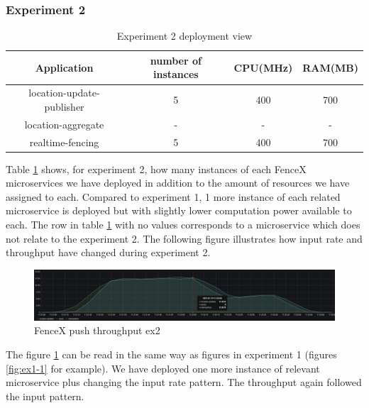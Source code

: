 \documentclass[a4]{report}
\begin{document}
    \clearpage

    \subsubsection{Experiment 2}
    \begin{table}[h!]
        \centering
        \begin{tabular}{|c|c|c|c|}
            \hline
            Application               & number of instances & CPU(MHz) & RAM(MB) \\
            \hline
            location-update-publisher & 5                   & 400      & 700     \\
            location-aggregate        & -                   & -        & -       \\
            realtime-fencing          & 5                   & 400      & 700     \\
            \hline
        \end{tabular}
        \caption{Experiment 2 deployment view}
        \label{table:ex2-dv}
    \end{table}

    Table \ref{table:ex2-dv} shows, for experiment 2, how many instances of each FenceX microservices we have
    deployed in addition to the amount of resources we have assigned to each.
    Compared to experiment 1, 1 more instance of each related microservice is deployed but with slightly lower
    computation power available to each.
    The row in table \ref{table:ex2-dv} with no values corresponds to a microservice which does not relate to the
    experiment 2.
    The following figure illustrates how input rate and throughput have changed during experiment 2.

    \begin{figure}[h!]
        \centering
        \caption{FenceX push throughput ex2}
        \label{fig:ex2}
        \includegraphics[width=\linewidth, scale=2]{images/evaluation/ex2-benchmarking(24,10).png}
    \end{figure}

    The figure \ref{fig:ex2} can be read in the same way as figures in experiment 1 (figures \ref{fig:ex1-1} for
    example).
    We have deployed one more instance of relevant microservice plus changing the input rate pattern.
    The throughput again followed the input pattern.
\end{document}
